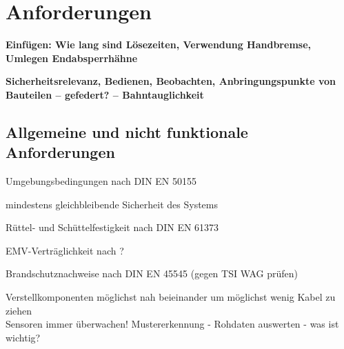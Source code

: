 \section{Anforderungen}
\textbf{Einfügen: Wie lang sind Lösezeiten, Verwendung Handbremse, Umlegen Endabsperrhähne}\par
\textbf{Sicherheitsrelevanz, Bedienen, Beobachten, Anbringungspunkte von Bauteilen -- gefedert? -- Bahntauglichkeit}\par
\subsection{Allgemeine und nicht funktionale Anforderungen}
\begin{feat}[Anf. X]
Umgebungsbedingungen nach \acrshort{DIN} \acrshort{EN} 50155
\end{feat}
\begin{feat}[Anf. X]
mindestens gleichbleibende Sicherheit des Systems
\end{feat}
\begin{feat}[Anf. X]
Rüttel- und Schüttelfestigkeit nach \acrshort{DIN} \acrshort{EN} 61373
\end{feat}
\begin{feat}
EMV-Verträglichkeit nach ?
\end{feat}
\begin{feat}
Brandschutznachweise nach \acrshort{DIN} \acrshort{EN} 45545 (gegen TSI WAG prüfen)
\end{feat}
Verstellkomponenten möglichst nah beieinander um möglichst wenig Kabel zu ziehen\\
Sensoren immer überwachen! Mustererkennung - Rohdaten auswerten - was ist wichtig?
